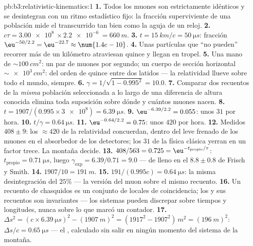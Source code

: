 \begin{solution}{pb:b3:relativistic-kinematics:1}
\textbf{1.} Todos los muones son estrictamente idénticos y se desintegran
con un ritmo estadístico fijo: la fracción superviviente de una población
mide el  transcurrido tan bien como la aguja de un reloj.
\textbf{2.} $c\tau = \qty{3.00e8}{} \times \qty{2.2e-6}{} =
\qty{660}{m}$.
\textbf{3.} $t = \qty{15}{km}/c = \qty{50}{\micro s}$: fracción
$\eu^{-50/2.2} = \eu^{-22.7} \approx \num{1.4e-10}$.
\textbf{4.} Unas partículas que ``no pueden'' recorrer más de un kilómetro
atraviesan quince y llegan en tropel.
\textbf{5.} Una mano de $\sim\qty{100}{cm^2}$: un par de muones por
segundo; un cuerpo de sección horizontal $\sim\num{e3}\,\unit{cm^2}$:
del orden de quince entre dos latidos --- la relatividad llueve sobre
todo el mundo, siempre.
\textbf{6.} $\gamma = 1/\sqrt{1 - 0.995^2} = 10.0$.
\textbf{7.} Comparar dos recuentos de la \emph{misma} población
seleccionada a lo largo de una diferencia de altura conocida elimina toda
suposición sobre dónde y cuántos muones nacen.
\textbf{8.} $t = 1907/(0.995 \times \num{3e8}) = \qty{6.39}{\micro s}$.
\textbf{9.} $\eu^{-6.39/2.2} = 0.055$: unos $31$ por hora.
\textbf{10.} $t/\gamma = \qty{0.64}{\micro s}$.
\textbf{11.} $\eu^{-0.64/2.2} = 0.75$: unos $420$ por hora.
\textbf{12.} Medidos $408 \pm 9$: los $\approx 420$ de la relatividad
concuerdan, dentro del leve frenado de los muones en el absorbedor de los
detectores; los $31$ de la física clásica yerran en un factor trece. La
montaña decide.
\textbf{13.} $408/563 = 0.725 = \eu^{-t_{\text{propio}}/\tau}$:
$t_{\text{propio}} = \qty{0.71}{\micro s}$, luego $\gamma_{\exp} =
6.39/0.71 = 9.0$ --- de lleno en el $8.8 \pm 0.8$ de Frisch y Smith.
\textbf{14.} $1907/10 = \qty{191}{m}$.
\textbf{15.} $191/(0.995c) = \qty{0.64}{\micro s}$: la misma
desintegración del $25\%$ --- la versión del muon sobre el mismo recuento.
\textbf{16.} Un recuento de chasquidos es un conjunto de  locales de
coincidencia; los  y sus recuentos son invariantes --- los sistemas
pueden discrepar sobre tiempos y longitudes, nunca sobre lo que marcó un
contador.
\textbf{17.} $\Delta s^2 = (c \times \qty{6.39}{\micro s})^2 -
(\qty{1907}{m})^2 = (1917^2 - 1907^2)\,\unit{m^2} = (\qty{196}{m})^2$:
$\Delta s/c = \qty{0.65}{\micro s}$ --- el , calculado sin
salir en ningún momento del sistema de la montaña.

\end{solution}
